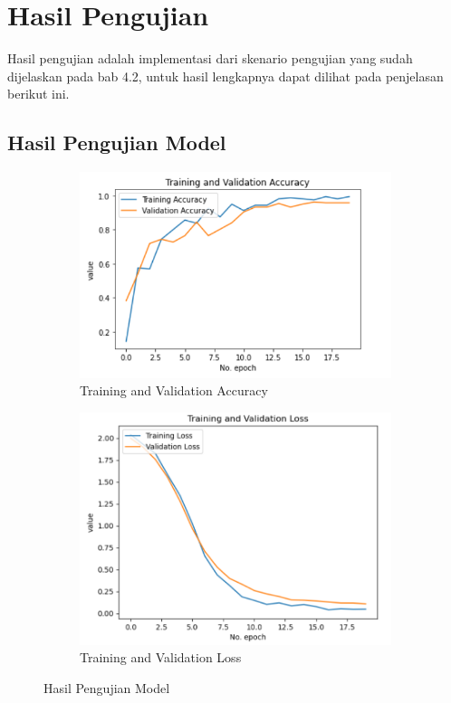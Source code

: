 \section{Hasil Pengujian}
\label{sec:hasilpengujian}

Hasil pengujian adalah implementasi dari skenario pengujian yang sudah dijelaskan pada bab 4.2, untuk hasil lengkapnya dapat dilihat pada penjelasan berikut ini.

\subsection{Hasil Pengujian Model}
\label{subsec:hasilpengujianmodel}

\begin{figure}[!htb]
  \centering
  \begin{subfigure}{0.53\textwidth}
    \centering
    \includegraphics[width=\linewidth]{gambar/training-validation-accuracy.png}
    \caption{Training and Validation Accuracy}
    \label{fig:landmarknextslide} 
  \end{subfigure}
  \begin{subfigure}{0.46\textwidth}
    \centering
    \includegraphics[width=\linewidth]{gambar/training-validation-loss.png}
    \caption{Training and Validation Loss}
    \label{fig:landmarkpreviousslide} 
  \end{subfigure}
  \caption{Hasil Pengujian Model}
  \label{fig:Pengujian Training Validation}
\end{figure}

